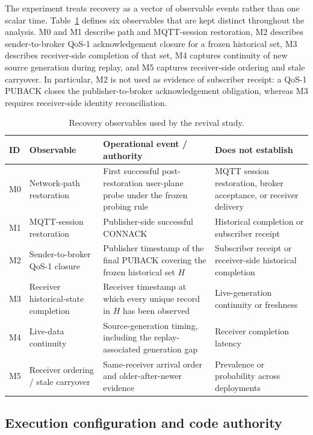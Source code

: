 \documentclass[journal]{IEEEtran}
\begin{document}
The experiment treats recovery as a vector of observable events rather than one scalar time. Table~\ref{tab:observables} defines six observables that are kept distinct throughout the analysis. M0 and M1 describe path and MQTT-session restoration, M2 describes sender-to-broker QoS-1 acknowledgement closure for a frozen historical set, M3 describes receiver-side completion of that set, M4 captures continuity of new source generation during replay, and M5 captures receiver-side ordering and stale carryover. In particular, M2 is not used as evidence of subscriber receipt: a QoS-1 PUBACK closes the publisher-to-broker acknowledgement obligation, whereas M3 requires receiver-side identity reconciliation.

\begin{table}[t]
\centering
\small
\caption{Recovery observables used by the revival study.}
\label{tab:observables}
\begin{tabular}{p{}p{}p{}p{}}
\toprule
\textbf{ID} & \textbf{Observable} & \textbf{Operational event / authority} & \textbf{Does not establish} \\
\midrule
M0 & Network-path restoration & First successful post-restoration user-plane probe under the frozen probing rule & MQTT session restoration, broker acceptance, or receiver delivery \\
M1 & MQTT-session restoration & Publisher-side successful CONNACK & Historical completion or subscriber receipt \\
M2 & Sender-to-broker QoS-1 closure & Publisher timestamp of the final PUBACK covering the frozen historical set $H$ & Subscriber receipt or receiver-side historical completion \\
M3 & Receiver historical-state completion & Receiver timestamp at which every unique record in $H$ has been observed & Live-generation continuity or freshness \\
M4 & Live-data continuity & Source-generation timing, including the replay-associated generation gap & Receiver completion latency \\
M5 & Receiver ordering / stale carryover & Same-receiver arrival order and older-after-newer evidence & Prevalence or probability across deployments \\
\bottomrule
\end{tabular}
\end{table}

\subsection{Execution configuration and code authority}
\end{document}
